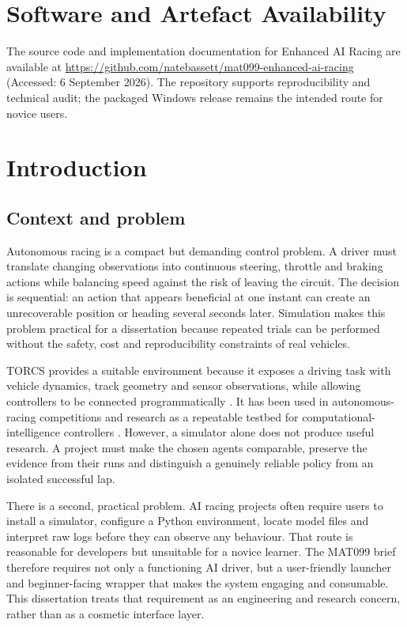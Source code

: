 \section*{Software and Artefact Availability}

The source code and implementation documentation for Enhanced AI Racing are available at \url{https://github.com/natebassett/mat099-enhanced-ai-racing} (Accessed: 6 September 2026). The repository supports reproducibility and technical audit; the packaged Windows release remains the intended route for novice users.
\tableofcontents
\listoffigures
\listoftables

\clearpage
{}

\section{Introduction}
\label{ch:introduction}

\subsection{Context and problem}

Autonomous racing is a compact but demanding control problem. A driver must translate changing observations into continuous steering, throttle and braking actions while balancing speed against the risk of leaving the circuit. The decision is sequential: an action that appears beneficial at one instant can create an unrecoverable position or heading several seconds later. Simulation makes this problem practical for a dissertation because repeated trials can be performed without the safety, cost and reproducibility constraints of real vehicles.

TORCS provides a suitable environment because it exposes a driving task with vehicle dynamics, track geometry and sensor observations, while allowing controllers to be connected programmatically \parencite{torcs2026}. It has been used in autonomous-racing competitions and research as a repeatable testbed for computational-intelligence controllers \parencite{loiacono2010}. However, a simulator alone does not produce useful research. A project must make the chosen agents comparable, preserve the evidence from their runs and distinguish a genuinely reliable policy from an isolated successful lap.

There is a second, practical problem. AI racing projects often require users to install a simulator, configure a Python environment, locate model files and interpret raw logs before they can observe any behaviour. That route is reasonable for developers but unsuitable for a novice learner. The MAT099 brief therefore requires not only a functioning AI driver, but a user-friendly launcher and beginner-facing wrapper that makes the system engaging and consumable. This dissertation treats that requirement as an engineering and research concern, rather than as a cosmetic interface layer.

